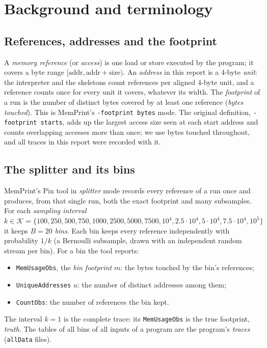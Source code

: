 \documentclass[11pt]{article}
\newcommand{\memprint}{MemPrint}
\newcommand{\term}[1]{\emph{#1}}
\newcommand{\code}[1]{\texttt{#1}}
\begin{document}
\section{Background and terminology}
\label{sec:background}

\subsection{References, addresses and the footprint}

A \term{memory reference} (or \term{access}) is one load or store executed by the program; it covers a byte range
$[\text{addr}, \text{addr}+\text{size})$. An \term{address} in this report is a 4-byte \term{unit}: the
interpreter and the skeletons count references per aligned 4-byte unit, and a reference counts once for every unit it
covers, whatever its width. The \term{footprint} of a run is the number of distinct bytes covered by at least one
reference (\term{bytes touched}). This is \memprint{}'s \code{-footprint bytes} mode. The original definition,
\code{-footprint starts}, adds up the largest access size seen at each start address and counts overlapping accesses
more than once; we use bytes touched throughout, and all traces in this report were recorded with it.

\subsection{The splitter and its bins}

\memprint{}'s Pin tool in \term{splitter} mode records every reference of a run once and produces, from that single
run, both the exact footprint and many subsamples. For each \term{sampling interval}
$k \in \mathcal{K} = \{100, 250, 500, 750, 1000, 2500, 5000, 7500, 10^4, 2.5\cdot 10^4, 5\cdot 10^4,
7.5\cdot 10^4, 10^5\}$ it keeps $B=20$ \term{bins}. Each bin keeps every reference independently with probability
$1/k$ (a Bernoulli subsample, drawn with an independent random stream per bin). For a bin the tool reports:
\begin{itemize}
\item \code{MemUsageObs}, the \term{bin footprint} $m$: the bytes touched by the bin's references;
\item \code{UniqueAddresses} $u$: the number of distinct addresses among them;
\item \code{CountObs}: the number of references the bin kept.
\end{itemize}
The interval $k=1$ is the complete trace: its \code{MemUsageObs} is the true footprint, \term{truth}. The tables
of all bins of all inputs of a program are the program's \term{traces} (\code{allData} files).
\end{document}
